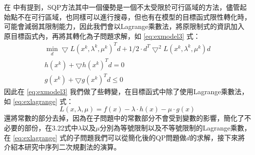 在 \cite{Gill.etc} 中有提到，SQP方法其中一個優勢是一個不太受限於可行區域的方法，儘管起始點不在可行區域，也同樣可以進行搜尋，但也有在模型的目標函式限性轉化時，可能會減弱其限制能力，因此我們會以Lagrange乘數法，將原限制式的資訊加入原目標函式內，再將其轉化為子問題求解，如 \ref{eq:exmodel3} 式：
\begin{equation}
	\begin{array}{c}
	\min_{d} \bigtriangledown L(x^{k},\lambda^{k},\mu^{k})^{T}d+1/2\cdot d^{T}\bigtriangledown^{2}L(x^{k},\lambda^{k},\mu^{k})d\\
	h(x^{k})+ \bigtriangledown h(x^{k})^{T}d=0\\
	g(x^{k})+ \bigtriangledown g(x^{k})^{T}d\leq 0
	\end{array}
\label{eq:exmodel3}
\end{equation}
因此在 \ref{eq:exmodel3} 我們做了些轉變，在目標函式中除了使用Lagrange乘數法，如 \ref{eq:exlagrange} 式：
\begin{equation}
L(x,\lambda,\mu)=f(x)-\lambda \cdot h(x)-\mu \cdot g(x)
\label{eq:exlagrange}
\end{equation}
還將常數的部分去掉，因為在子問題中的常數部分不會受到變數的影響，簡化了不必要的部份，在3.22式中$\lambda$以及$\mu$分別為等號限制以及不等號限制的Lagrange乘數，在 \ref{eq:exlagrange} 式的子問題我們可以從簡化後的QP問題做$d$的求解，接下來將介紹本研究中序列二次規劃法的演算。

